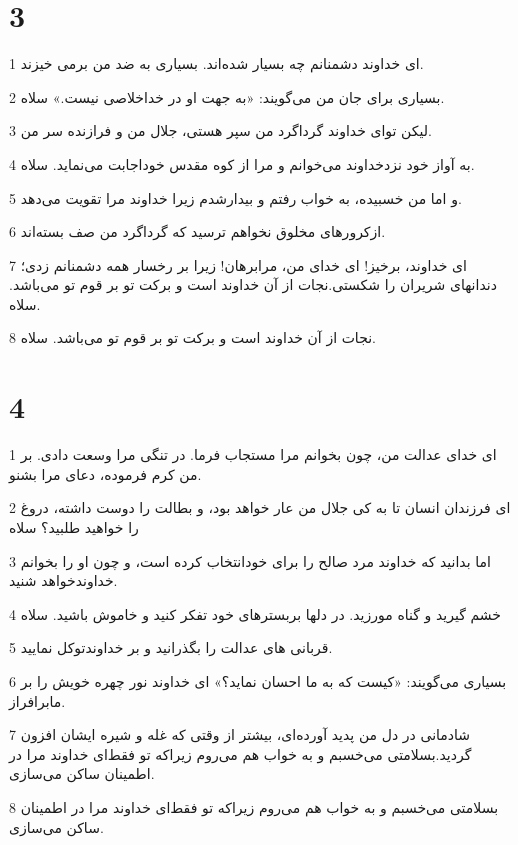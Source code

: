 \chapter{3}

\par 1 ای خداوند دشمنانم چه بسیار شده‌اند. بسیاری به ضد من برمی خیزند.
\par 2 بسیاری برای جان من می‌گویند: «به جهت او در خداخلاصی نیست.» سلاه.
\par 3 لیکن تو‌ای خداوند گرداگرد من سپر هستی، جلال من و فرازنده سر من.
\par 4 به آواز خود نزدخداوند می‌خوانم و مرا از کوه مقدس خوداجابت می‌نماید. سلاه.
\par 5 و اما من خسبیده، به خواب رفتم و بیدارشدم زیرا خداوند مرا تقویت می‌دهد.
\par 6 ازکرورهای مخلوق نخواهم ترسید که گرداگرد من صف بسته‌اند.
\par 7 ‌ای خداوند، برخیز! ای خدای من، مرابرهان! زیرا بر رخسار همه دشمنانم زدی؛ دندانهای شریران را شکستی.نجات از آن خداوند است و برکت تو بر قوم تو می‌باشد. سلاه.
\par 8 نجات از آن خداوند است و برکت تو بر قوم تو می‌باشد. سلاه.
 
\chapter{4}

\par 1 ای خدای عدالت من، چون بخوانم مرا مستجاب فرما. در تنگی مرا وسعت دادی. بر من کرم فرموده، دعای مرا بشنو.
\par 2 ‌ای فرزندان انسان تا به کی جلال من عار خواهد بود، و بطالت را دوست داشته، دروغ را خواهید طلبید؟ سلاه
\par 3 اما بدانید که خداوند مرد صالح را برای خودانتخاب کرده است، و چون او را بخوانم خداوندخواهد شنید.
\par 4 خشم گیرید و گناه مورزید. در دلها بربسترهای خود تفکر کنید و خاموش باشید. سلاه
\par 5 قربانی های عدالت را بگذرانید و بر خداوندتوکل نمایید.
\par 6 بسیاری می‌گویند: «کیست که به ما احسان نماید؟» ای خداوند نور چهره خویش را بر مابرافراز.
\par 7 شادمانی در دل من پدید آورده‌ای، بیشتر از وقتی که غله و شیره ایشان افزون گردید.بسلامتی می‌خسبم و به خواب هم می‌روم زیراکه تو فقط‌ای خداوند مرا در اطمینان ساکن می‌سازی.
\par 8 بسلامتی می‌خسبم و به خواب هم می‌روم زیراکه تو فقط‌ای خداوند مرا در اطمینان ساکن می‌سازی.
 
